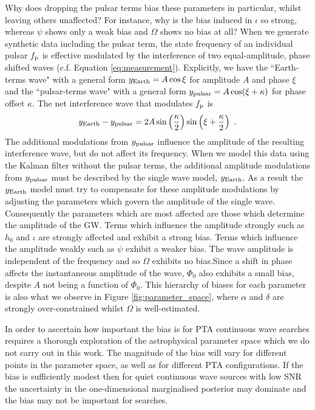 \documentclass[fleqn,usenatbib,useAMS]{mnras}
\begin{document}
Why does dropping the pulsar terms bias these parameters in particular, whilst leaving others unaffected? For instance, why is the bias induced in $\iota$ so strong, whereas $\psi$ shows only a weak bias and  $\Omega$ shows no bias at all? When we generate synthetic data including the pulsar term, the state frequency of an individual pulsar $f_{\rm p}$ is effective modulated by the interference of two equal-amplitude, phase shifted waves (c.f. Equation \ref{eq:measurement}). Explicitly, we have the ``Earth-terms wave"	 with a general form $y_{\rm Earth} = A \cos \xi$ for amplitude $A$ and phase $\xi$ and the ``pulsar-terms wave" with a general form $y_{\rm pulsar} = A \cos (\xi + \kappa)$ for phase offset $\kappa$. The net interference wave that modulates $f_{\rm p}$ is 
\begin{eqnarray}
	y_{\rm Earth} - y_{\rm pulsar} = 2 A \sin \left(\frac{\kappa}{2}\right) \sin \left(\xi + \frac{\kappa}{2}\right) \ .
\end{eqnarray}
The additional modulations from $y_{\rm pulsar}$ influence the amplitude of the resulting interference wave, but do not affect its frequency. When we model this data using the Kalman filter without the pulsar terms, the additional amplitude modulations from $y_{\rm pulsar}$ must be described by the single wave model, $y_{\rm Earth}$. As a result the $y_{\rm Earth}$ model must try to compensate for these amplitude modulations by adjusting the parameters which govern the amplitude of the single wave. Consequently the parameters which are most affected are those which determine the amplitude of the GW. Terms which influence the amplitude strongly such as $h_0$ and $\iota$ are strongly affected and exhibit a strong bias. Terms which influence the amplitude weakly such as $\psi$ exhibit a weaker bias. The wave amplitude is independent of the frequency and so $\Omega$ exhibits no bias.Since a shift in phase affects the instantaneous amplitude of the wave, $\Phi_0$ also exhibits a small bias, despite $A$ not being a function of $\Phi_0$. This hierarchy of biases for each parameter is also what we observe in Figure \ref{fig:parameter_space}, where $\alpha$ and $\delta$ are strongly over-constrained whilst $\Omega$ is well-estimated. \newline  

In order to ascertain how important the bias is for PTA continuous wave searches requires a thorough exploration of the astrophysical parameter space which we do not carry out in this work. The magnitude of the bias will vary for different points in the parameter space, as well as for different PTA configurations. If the bias is sufficiently modest then for quiet continuous wave sources with low SNR the uncertainty in the one-dimensional marginalised posterior may dominate and the bias may not be important for searches. 
\end{document}
